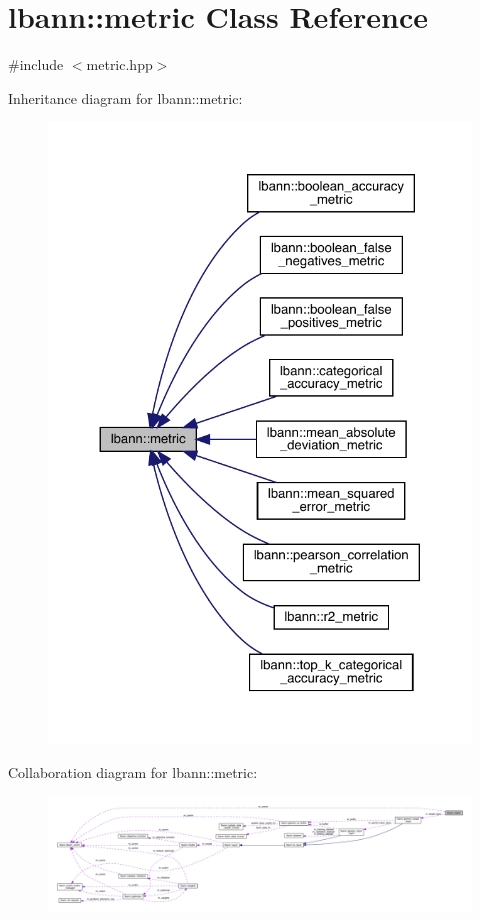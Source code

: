 \hypertarget{classlbann_1_1metric}{}\section{lbann\+:\+:metric Class Reference}
\label{classlbann_1_1metric}


{\ttfamily \#include $<$metric.\+hpp$>$}



Inheritance diagram for lbann\+:\+:metric\+:\nopagebreak
\begin{figure}[H]
\begin{center}
\leavevmode
\includegraphics[width=324pt]{classlbann_1_1metric__inherit__graph}
\end{center}
\end{figure}


Collaboration diagram for lbann\+:\+:metric\+:\nopagebreak
\begin{figure}[H]
\begin{center}
\leavevmode
\includegraphics[width=350pt]{classlbann_1_1metric__coll__graph}
\end{center}
\end{figure}
